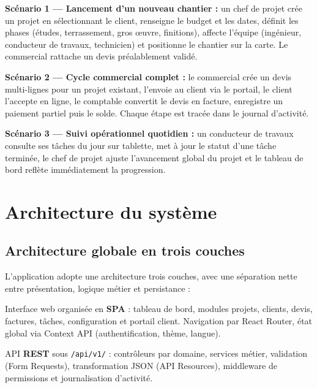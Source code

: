 \textbf{Scénario 1 --- Lancement d'un nouveau chantier :}
un chef de projet crée un projet en sélectionnant le client, renseigne le budget et
les dates, définit les phases (études, terrassement, gros œuvre, finitions), affecte
l'équipe (ingénieur, conducteur de travaux, technicien) et positionne le chantier
sur la carte. Le commercial rattache un devis préalablement validé.

\medskip

\textbf{Scénario 2 --- Cycle commercial complet :}
le commercial crée un devis multi-lignes pour un projet existant, l'envoie au client
via le portail, le client l'accepte en ligne, le comptable convertit le devis en
facture, enregistre un paiement partiel puis le solde. Chaque étape est tracée dans
le journal d'activité.

\medskip

\textbf{Scénario 3 --- Suivi opérationnel quotidien :}
un conducteur de travaux consulte ses tâches du jour sur tablette, met à jour le
statut d'une tâche terminée, le chef de projet ajuste l'avancement global du projet
et le tableau de bord reflète immédiatement la progression.

\section{Architecture du système}

\subsection{Architecture globale en trois couches}

L'application adopte une architecture trois couches, avec une séparation nette entre
présentation, logique métier et persistance :

\begin{tcolorbox}[colback=ensamBlue!5, colframe=ensamBlue,
  title={\textbf{Couche Présentation} : React 19 + Vite + Tailwind CSS}, arc=3pt, boxrule=0.8pt]
Interface web organisée en \textbf{SPA} : tableau de bord, modules projets, clients,
devis, factures, tâches, configuration et portail client. Navigation par React Router,
état global via Context API (authentification, thème, langue).
\end{tcolorbox}

\vspace{-0.2cm}

\begin{tcolorbox}[colback=ensamBlue!10, colframe=ensamBlue,
  title={\textbf{Couche Logique métier} : Laravel 13 + Sanctum}, arc=3pt, boxrule=0.8pt]
API \textbf{REST} sous \texttt{/api/v1/} : contrôleurs par domaine, services métier,
validation (Form Requests), transformation JSON (API Resources), middleware de
permissions et journalisation d'activité.
\end{tcolorbox}

